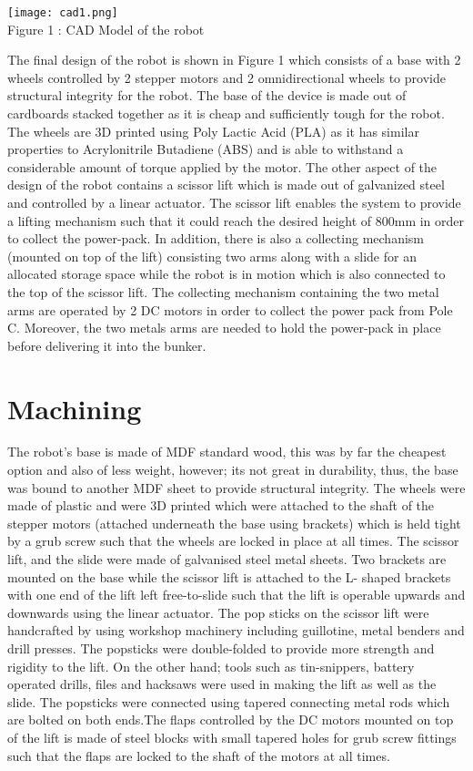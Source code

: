 \documentclass[12pt]{report}
\begin{document}
\begin{center}
\texttt{[image: cad1.png]}\\
Figure 1 : CAD Model of the robot
\end{center}


The final design of the robot is shown in Figure 1 which consists of a base with 2 wheels controlled by 2 stepper motors and 2 omnidirectional wheels to provide structural integrity for the robot. The base of the device is made out of cardboards stacked together as it is cheap and sufficiently tough for the robot. The wheels are 3D printed using Poly Lactic Acid (PLA) as it has similar properties to Acrylonitrile Butadiene (ABS) and is able to withstand a considerable amount of torque applied by the motor. The other aspect of the design of the robot contains a scissor lift which is made out of galvanized steel and controlled by a linear actuator. The scissor lift enables the system to provide a lifting mechanism such that it could reach the desired height of 800mm in order to collect the power-pack. In addition, there is also a collecting mechanism (mounted on top of the lift) consisting two arms along with a slide for an allocated storage space while the robot is in motion which is also connected to the top of the scissor lift. The collecting mechanism containing the two metal arms are operated by 2 DC motors in order to collect the power pack from Pole C. Moreover, the two metals arms are needed to hold the power-pack in place before delivering it into the bunker.


\section{Machining}
The robot’s base is made of MDF standard wood, this was by far the cheapest option and also of less weight, however; its not great in durability, thus, the base was bound to another MDF sheet to provide structural integrity. The wheels were made of plastic and were 3D printed which were attached to the shaft of the stepper motors (attached underneath the base using brackets) which is held tight by a grub screw such that the wheels are locked in place at all times. The scissor lift, and the slide were made of galvanised steel metal sheets. Two brackets are mounted on the base while the scissor lift is attached to the L- shaped brackets with one end of the lift left free-to-slide such that the lift is operable upwards and downwards using the linear actuator. The pop sticks on the scissor lift were handcrafted by using workshop machinery including guillotine, metal benders and drill presses. The popsticks were double-folded to provide more strength and rigidity to the lift. On the other hand; tools such as tin-snippers, battery operated drills, files and hacksaws were used in making the lift as well as the slide. The popsticks were connected using tapered connecting metal rods which are bolted on both ends.The flaps controlled by the DC motors mounted on top of the lift is made of steel blocks with small tapered holes for grub screw fittings such that the flaps are locked to the shaft of the motors at all times. 
\end{document}
